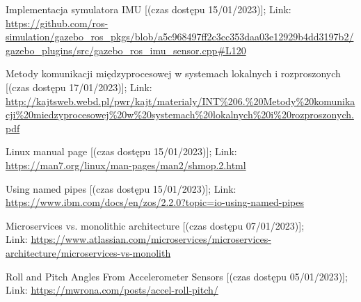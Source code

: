 \begin{thebibliography}{9}
    Implementacja symulatora IMU [(czas dostępu  15/01/2023)]; 
    Link: \url{https://github.com/ros-simulation/gazebo_ros_pkgs/blob/a5c968497ff2c3cc353daa03e12929b4dd3197b2/gazebo_plugins/src/gazebo_ros_imu_sensor.cpp#L120}

    Metody komunikacji międzyprocesowej w systemach
lokalnych i rozproszonych [(czas dostępu  17/01/2023)]; 
    Link: \url{http://kajtsweb.webd.pl/pwr/kajt/materialy/INT\%206.\%20Metody\%20komunikacji\%20miedzyprocesowej\%20w\%20systemach\%20lokalnych\%20i\%20rozproszonych.pdf}

    Linux manual page [(czas dostępu  15/01/2023)]; 
    Link: \url{https://man7.org/linux/man-pages/man2/shmop.2.html}

    Using named pipes [(czas dostępu  15/01/2023)]; 
    Link: \url{https://www.ibm.com/docs/en/zos/2.2.0?topic=io-using-named-pipes}

    Microservices vs. monolithic architecture [(czas dostępu  07/01/2023)]; \\ 
    Link: \url{https://www.atlassian.com/microservices/microservices-architecture/microservices-vs-monolith}

    Roll and Pitch Angles From Accelerometer Sensors [(czas dostępu  05/01/2023)]; \\
    Link: \url{https://mwrona.com/posts/accel-roll-pitch/}

\end{thebibliography}
